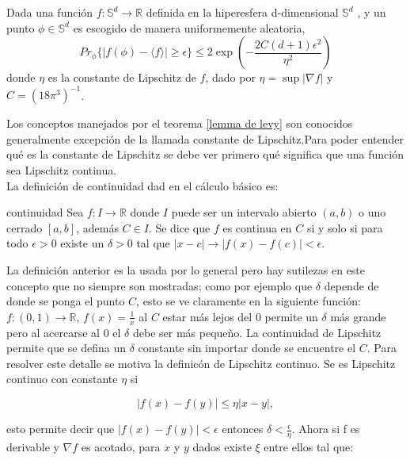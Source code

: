 \begin{lemma} \label{cap2 lemma de levy}

Dada una función $f: \mathbb{S}^d \to \mathbb{R} $ definida en la hiperesfera d-dimensional $\mathbb{S}^d$ , y un punto $\phi \in \mathbb{S}^d $ es escogido de manera uniformemente aleatoria,
\begin{equation}
Pr_{\phi} \{ |f(\phi)- \langle f \rangle| \geq \epsilon \} \leq 2 \exp(-\frac{2C(d+1)\epsilon^2}{\eta^2})
\end{equation}
donde $\eta$ es la constante de Lipschitz de $f$, dado por $\eta= \sup|\nabla f|$ y $C=(18 \pi^3)^{-1} $.\\

\end{lemma}

Los conceptos manejados por el teorema \ref{lemma de levy} son conocidos generalmente excepción de la llamada constante de Lipschitz.Para poder entender qué es la  constante de Lipschitz se debe ver primero qué significa que una función sea Lipschitz continua. 
\\
La definición de continuidad dad en el cálculo básico es:

\theoremstyle{definition}
\begin{definition}{continuidad}
Sea $f: I \to \mathbb{R}$ donde $I$ puede ser un intervalo abierto $(a,b)$ o uno cerrado $[a,b]$, además $C \in I$. Se dice que $f$ es continua en $C$ si y solo si para todo $ \epsilon >0 $  existe un $ \delta >0 $ tal que  $ |x-c|\longrightarrow |f(x)-f(c)|< \epsilon $.
\end{definition} 

La  definición anterior es la usada por lo general pero hay sutilezas en este concepto que no siempre son mostradas; como por ejemplo que $\delta$ depende de donde se ponga el  punto $C$, esto se ve claramente en la siguiente función: $f: (0,1) \to \mathbb{R}$, $f(x)=\frac{1}{x} $ al $C$ estar más lejos del $0$ permite un $\delta$ más grande pero al acercarse al $0$ el $\delta$ debe ser más pequeño. La continuidad de Lipschitz permite que se defina un $\delta$ constante sin importar donde se encuentre el $C$. Para resolver este detalle se motiva la definicón de Lipschitz continuo. Se es Lipschitz continuo con constante $\eta$ si

\begin{equation}
|f(x) -f(y)| \leq \eta |x-y|,
\end{equation}

esto permite decir que  $|f(x)-f(y)| < \epsilon $ entonces $\delta < \frac{\epsilon}{\eta} $. Ahora si f es derivable y $\nabla f$ es acotado, para $x$ y $y$ dados existe $\xi$ entre ellos tal que:


